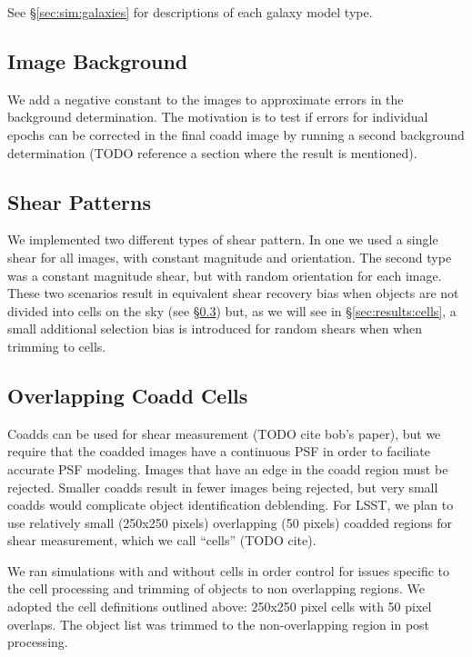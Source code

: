 \documentclass[iop, twocolappendix, appendixfloats, numberedappendix, apj]{hackemulateapj}
\begin{document}
See \S \ref{sec:sim:galaxies} for descriptions of each galaxy model type.

\subsection{Image Background} \label{sec:sim:bgerr}

We add a negative constant to the images to approximate errors in the
background determination.  The motivation is to test if errors for individual
epochs can be corrected in the final coadd image by running a second background
determination (TODO reference a section where the result is mentioned).

\subsection{Shear Patterns} \label{sec:sim:shears}

We implemented two different types of shear pattern.  In one we used a single
shear for all images, with constant magnitude and orientation.  The second type
was a constant magnitude shear, but with random orientation for each image.
These two scenarios result in equivalent shear recovery bias when objects are
not divided into cells on the sky (see \S \ref{sec:sim:cells}) but, as we will
see in \S \ref{sec:results:cells}, a small additional selection bias is
introduced for random shears when when trimming to cells.

\subsection{Overlapping Coadd Cells} \label{sec:sim:cells}

Coadds can be used for shear measurement (TODO cite bob's paper), but we
require that the coadded images have a continuous PSF in order to faciliate
accurate PSF modeling.  Images that have an edge in the coadd region must be
rejected.  Smaller coadds result in fewer images being rejected, but very small
coadds would complicate object identification deblending.  For LSST, we plan to
use relatively small (250x250 pixels) overlapping (50 pixels) coadded regions
for shear measurement, which we call ``cells'' (TODO cite).

We ran simulations with and without cells in order control for issues specific
to the cell processing and trimming of objects to non overlapping regions.  We
adopted the cell definitions outlined above: 250x250 pixel cells with 50 pixel
overlaps. The object list was trimmed to the non-overlapping region in post
processing.
\end{document}
